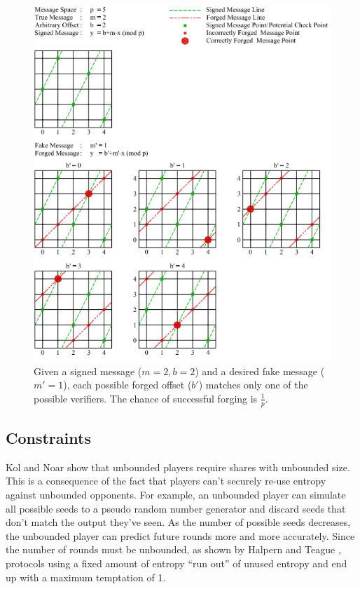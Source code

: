 \documentclass{dalcsthesis}
\begin{document}
\begin{figure}
\includegraphics[width=\textwidth]{../../Graphics/PointAndLineExample.png}
\caption{Given a signed message ($m=2, b=2$) and a desired fake message ($m'=1$), each possible forged offset ($b'$) matches only one of the possible verifiers. The chance of successful forging is $\frac{1}{p}$.}
\label{img:ForgingVerifiableMessageForUnbounded}
\end{figure}

\subsection{Constraints}

Kol and Noar \cite{Kol08} show that unbounded players require shares with unbounded size. This is a consequence of the fact that players can't securely re-use entropy against unbounded opponents. For example, an unbounded player can simulate all possible seeds to a pseudo random number generator and discard seeds that don't match the output they've seen. As the number of possible seeds decreases, the unbounded player can predict future rounds more and more accurately. Since the number of rounds must be unbounded, as shown by Halpern and Teague \cite{halpern04}, protocols using a fixed amount of entropy ``run out'' of unused entropy and end up with a maximum temptation of 1.
\end{document}
